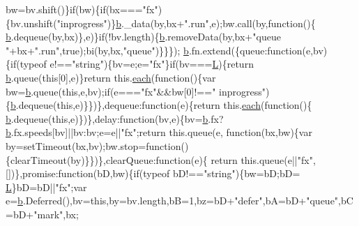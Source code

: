 \begin{DoxyCode}
      bw=bv.shift()\}\textcolor{keywordflow}{if}(bw)\{\textcolor{keywordflow}{if}(bx===\textcolor{stringliteral}{"fx"})\{bv.unshift(\textcolor{stringliteral}{"inprogress"})\}\hyperlink{jquery_8js_aa4026ad5544b958e54ce5e106fa1c805}{b}.\_data(by,bx+\textcolor{stringliteral}{".run"},e);bw.call(by,\textcolor{keyword}{function}()\{
      \hyperlink{jquery_8js_aa4026ad5544b958e54ce5e106fa1c805}{b}.dequeue(by,bx)\},e)\}\textcolor{keywordflow}{if}(!bv.length)\{\hyperlink{jquery_8js_aa4026ad5544b958e54ce5e106fa1c805}{b}.removeData(by,bx+\textcolor{stringliteral}{"queue "}+bx+\textcolor{stringliteral}{".run"},\textcolor{keyword}{true});bi(by,bx,\textcolor{stringliteral}{"queue"})\}\}\});
      \hyperlink{jquery_8js_aa4026ad5544b958e54ce5e106fa1c805}{b}.fn.extend(\{queue:\textcolor{keyword}{function}(e,bv)\{\textcolor{keywordflow}{if}(typeof e!==\textcolor{stringliteral}{"string"})\{bv=e;e=\textcolor{stringliteral}{"fx"}\}\textcolor{keywordflow}{if}(bv===\hyperlink{jquery_8js_a38ee4c0b5f4fe2a18d0c783af540d253}{L})\{\textcolor{keywordflow}{return} 
      \hyperlink{jquery_8js_aa4026ad5544b958e54ce5e106fa1c805}{b}.queue(\textcolor{keyword}{this}[0],e)\}\textcolor{keywordflow}{return} this.\hyperlink{jquery_8js_a871ff39db627c54c710a3e9909b8234c}{each}(\textcolor{keyword}{function}()\{var bw=\hyperlink{jquery_8js_aa4026ad5544b958e54ce5e106fa1c805}{b}.queue(\textcolor{keyword}{this},e,bv);\textcolor{keywordflow}{if}(e===\textcolor{stringliteral}{"fx"}&&bw[0]!==\textcolor{stringliteral}{"
      inprogress"})\{\hyperlink{jquery_8js_aa4026ad5544b958e54ce5e106fa1c805}{b}.dequeue(\textcolor{keyword}{this},e)\}\})\},dequeue:\textcolor{keyword}{function}(e)\{\textcolor{keywordflow}{return} this.\hyperlink{jquery_8js_a871ff39db627c54c710a3e9909b8234c}{each}(\textcolor{keyword}{function}()\{
      \hyperlink{jquery_8js_aa4026ad5544b958e54ce5e106fa1c805}{b}.dequeue(\textcolor{keyword}{this},e)\})\},delay:\textcolor{keyword}{function}(bv,e)\{bv=\hyperlink{jquery_8js_aa4026ad5544b958e54ce5e106fa1c805}{b}.fx?\hyperlink{jquery_8js_aa4026ad5544b958e54ce5e106fa1c805}{b}.fx.speeds[bv]||bv:bv;e=e||\textcolor{stringliteral}{"fx"};\textcolor{keywordflow}{return} this.queue(e,\textcolor{keyword}{
      function}(bx,bw)\{var by=setTimeout(bx,bv);bw.stop=\textcolor{keyword}{function}()\{clearTimeout(by)\}\})\},clearQueue:\textcolor{keyword}{function}(e)\{\textcolor{keywordflow}{
      return} this.queue(e||\textcolor{stringliteral}{"fx"},[])\},promise:\textcolor{keyword}{function}(bD,bw)\{\textcolor{keywordflow}{if}(typeof bD!==\textcolor{stringliteral}{"string"})\{bw=bD;bD=
      \hyperlink{jquery_8js_a38ee4c0b5f4fe2a18d0c783af540d253}{L}\}bD=bD||\textcolor{stringliteral}{"fx"};var e=\hyperlink{jquery_8js_aa4026ad5544b958e54ce5e106fa1c805}{b}.Deferred(),bv=\textcolor{keyword}{this},by=bv.length,bB=1,bz=bD+\textcolor{stringliteral}{"defer"},bA=bD+\textcolor{stringliteral}{"queue"},bC=bD+\textcolor{stringliteral}{"mark"},bx;\textcolor{keyword}{
}
\end{DoxyCode}
